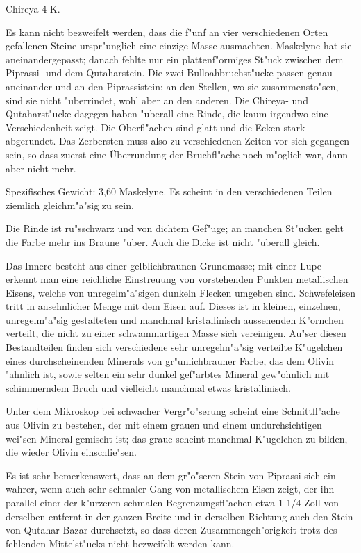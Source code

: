 \documentclass[a4paper, 11pt, oneside]{article}
\begin{document}
Chireya  
4 K.

Es kann nicht bezweifelt werden, dass die f"unf an vier verschiedenen Orten gefallenen Steine urspr"unglich eine einzige Masse ausmachten. Maskelyne hat sie aneinandergepasst; danach fehlte nur ein plattenf"ormiges St"uck zwischen dem Piprassi- und dem Qutaharstein. Die zwei Bulloahbruchst"ucke passen genau aneinander und an den Piprassistein; an den Stellen, wo sie zusammensto"sen, sind sie nicht "uberrindet, wohl aber an den anderen. Die Chireya- und Qutaharst"ucke dagegen haben "uberall eine Rinde, die kaum irgendwo eine Verschiedenheit zeigt. Die Oberfl"achen sind glatt und die Ecken stark abgerundet. Das Zerbersten muss also zu verschiedenen Zeiten vor sich gegangen sein, so dass zuerst eine Überrundung der Bruchfl"ache noch m"oglich war, dann aber nicht mehr.

Spezifisches Gewicht: 3,60 Maskelyne. Es scheint in den verschiedenen Teilen ziemlich gleichm"a"sig zu sein.

Die Rinde ist ru"sschwarz und von dichtem Gef"uge; an manchen St"ucken geht die Farbe mehr ins Braune "uber. Auch die Dicke ist nicht "uberall gleich.

Das Innere besteht aus einer gelblichbraunen Grundmasse; mit einer Lupe erkennt man eine reichliche Einstreuung von vorstehenden Punkten metallischen Eisens, welche von unregelm"a"sigen dunkeln Flecken umgeben sind. Schwefeleisen tritt in ansehnlicher Menge mit dem Eisen auf. Dieses ist in kleinen, einzelnen, unregelm"a"sig gestalteten und manchmal kristallinisch aussehenden K"ornchen verteilt, die nicht zu einer schwammartigen Masse sich vereinigen. Au"ser diesen Bestandteilen finden sich verschiedene sehr unregelm"a"sig verteilte K"ugelchen eines durchscheinenden Minerals von gr"unlichbrauner Farbe, das dem Olivin "ahnlich ist, sowie selten ein sehr dunkel gef"arbtes Mineral gew"ohnlich mit schimmerndem Bruch und vielleicht manchmal etwas kristallinisch.

Unter dem Mikroskop bei schwacher Vergr"o"serung scheint eine Schnittfl"ache aus Olivin zu bestehen, der mit einem grauen und einem undurchsichtigen wei"sen Mineral gemischt ist; das graue scheint manchmal K"ugelchen zu bilden, die wieder Olivin einschlie"sen.

Es ist sehr bemerkenswert, dass au dem gr"o"seren Stein von Piprassi sich ein wahrer, wenn auch sehr schmaler Gang von metallischem Eisen zeigt, der ihn parallel einer der k"urzeren schmalen Begrenzungsfl"achen etwa 1 1/4 Zoll von derselben entfernt in der ganzen Breite und in derselben Richtung auch den Stein von Qutahar Bazar durchsetzt, so dass deren Zusammengeh"origkeit trotz des fehlenden Mittelst"ucks nicht bezweifelt werden kann.
\end{document}
